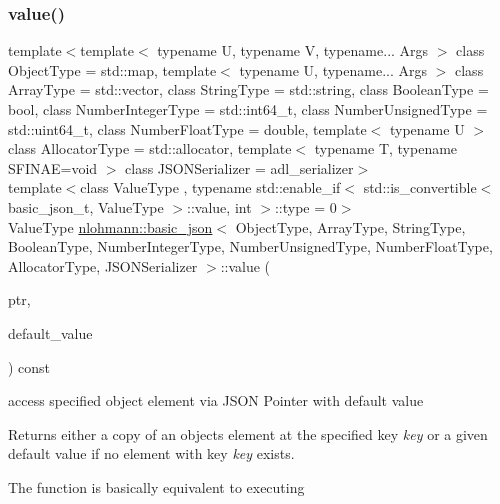 \subsubsection{\texorpdfstring{value()}{value()}\hspace{0.1cm}{\footnotesize\ttfamily [3/4]}}
{\footnotesize\ttfamily template$<$template$<$ typename U, typename V, typename... Args $>$ class Object\+Type = std\+::map, template$<$ typename U, typename... Args $>$ class Array\+Type = std\+::vector, class String\+Type  = std\+::string, class Boolean\+Type  = bool, class Number\+Integer\+Type  = std\+::int64\+\_\+t, class Number\+Unsigned\+Type  = std\+::uint64\+\_\+t, class Number\+Float\+Type  = double, template$<$ typename U $>$ class Allocator\+Type = std\+::allocator, template$<$ typename T, typename S\+F\+I\+N\+A\+E=void $>$ class J\+S\+O\+N\+Serializer = adl\+\_\+serializer$>$ \\
template$<$class Value\+Type , typename std\+::enable\+\_\+if$<$ std\+::is\+\_\+convertible$<$ basic\+\_\+json\+\_\+t, Value\+Type $>$\+::value, int $>$\+::type  = 0$>$ \\
Value\+Type \mbox{\hyperlink{classnlohmann_1_1basic__json}{nlohmann\+::basic\+\_\+json}}$<$ Object\+Type, Array\+Type, String\+Type, Boolean\+Type, Number\+Integer\+Type, Number\+Unsigned\+Type, Number\+Float\+Type, Allocator\+Type, J\+S\+O\+N\+Serializer $>$\+::value (\begin{DoxyParamCaption}\item[{const \mbox{\hyperlink{classnlohmann_1_1basic__json_1_1json__pointer}{json\+\_\+pointer}} \&}]{ptr,  }\item[{Value\+Type}]{default\+\_\+value }\end{DoxyParamCaption}) const\hspace{0.3cm}{\ttfamily [inline]}}



access specified object element via J\+S\+ON Pointer with default value 

Returns either a copy of an object\textquotesingle{}s element at the specified key {\itshape key} or a given default value if no element with key {\itshape key} exists.

The function is basically equivalent to executing 
\begin{DoxyCode}{0}
\DoxyCodeLine{\textcolor{keywordflow}{try} \{}
\DoxyCodeLine{\}}
\end{DoxyCode}


